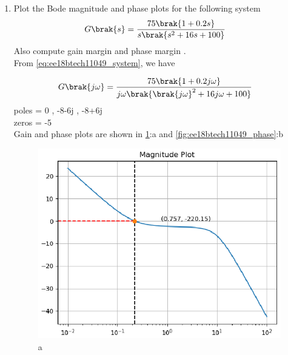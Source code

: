 \begin{enumerate}[label=\thesection.\arabic*.,ref=\thesection.\theenumi]

\item Plot the Bode magnitude and phase plots for the following system
\begin{align}
G\brak{s} &= \frac{75\brak{1+0.2s}}{s\brak{s^2+16s+100}}
\label{eq:ee18btech11049_system}
\end{align}
Also compute gain margin and phase margin .
\\
\solution From  \eqref{eq:ee18btech11049_system}, we have 

\begin{align}
G\brak{j\omega}&=\frac{75\brak{1+0.2j\omega}}{j\omega\brak{\brak{j\omega}^2 + 16j\omega+100} }
\end{align}
poles = 0 , -8-6j , -8+6j\\
zeros = -5\\
Gain and phase plots are shown in \ref{fig:ee18btech11049_gain}:a and \ref{fig:ee18btech11049_phase}:b 
\begin{figure}[!h]
\centering
  \includegraphics[width=\columnwidth]{./figs/ee18btech11049_1.eps}
  \caption{a}
  \label{fig:ee18btech11049_gain}
\end{figure}
\begin{figure}[!h]
\centering

\end{figure}
\end{enumerate}
